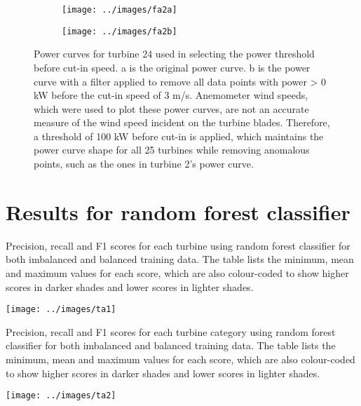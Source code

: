 \begin{figure}
  \centering
  \begin{subfigure}[t]{.5\textwidth}
    \centering
    \texttt{[image: ../images/fa2a]}
    \caption{}
  \end{subfigure}
  \begin{subfigure}[t]{.5\textwidth}
    \centering
    \texttt{[image: ../images/fa2b]}
    \caption{}
  \end{subfigure}
  \captionsetup{labelformat=empty,list=no}
  \caption{Power curves for turbine 24 used in selecting the power threshold before cut-in speed. a is the original power curve. b is the power curve with a filter applied to remove all data points with power > 0 kW before the cut-in speed of 3 m/s. Anemometer wind speeds, which were used to plot these power curves, are not an accurate measure of the wind speed incident on the turbine blades. Therefore, a threshold of 100 kW before cut-in is applied, which maintains the power curve shape for all 25 turbines while removing anomalous points, such as the ones in turbine 2's power curve.}
\end{figure}

\chapter{Results for random forest classifier}\label{a3}

\begin{landscape}
  \begin{table}
    \centering
    \captionsetup{labelformat=empty,list=no}
    \caption{Precision, recall and F1 scores for each turbine using random forest classifier for both imbalanced and balanced training data. The table lists the minimum, mean and maximum values for each score, which are also colour-coded to show higher scores in darker shades and lower scores in lighter shades.}
    \texttt{[image: ../images/ta1]}
  \end{table}
\end{landscape}

\begin{table}
  \centering
  \captionsetup{labelformat=empty,list=no}
  \caption{Precision, recall and F1 scores for each turbine category using random forest classifier for both imbalanced and balanced training data. The table lists the minimum, mean and maximum values for each score, which are also colour-coded to show higher scores in darker shades and lower scores in lighter shades.}
  \texttt{[image: ../images/ta2]}
\end{table}


